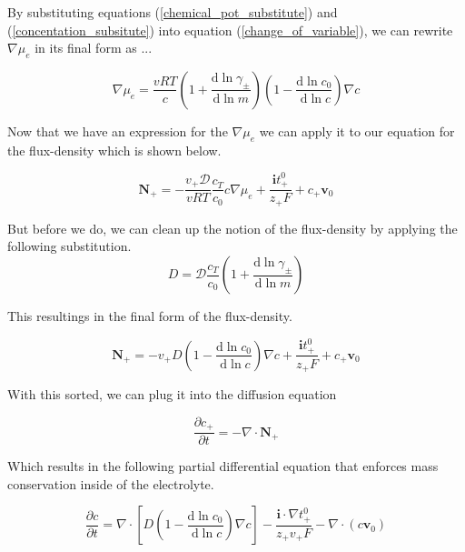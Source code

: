 \documentclass[lettersize,journal]{IEEEtran}
\begin{document}
By substituting equations (\ref{chemical_pot_substitute}) and (\ref{concentation_subsitute}) into equation (\ref{change_of_variable}), we can rewrite $\nabla \mu_e$ in its final form as ...

\begin{equation}
\nabla \mu_{e}=\frac{v R T}{c}\left(1+\frac{\mathrm{d} \ln \gamma_{\pm}}{\mathrm{d} \ln m}\right)\left(1-\frac{\mathrm{d} \ln c_{0}}{\mathrm{~d} \ln c}\right) \nabla c
\end{equation}


Now that we have an expression for the $\nabla \mu_e$ we can apply it to our equation for the flux-density which is shown below.

\begin{equation}
\mathbf{N}_{+}=-\frac{v_{+} \mathscr{D}}{v R T} \frac{c_{T}}{c_{0}} c \nabla \mu_{e}+\frac{\mathbf{i} t_{+}^{0}}{z_{+} F}+c_{+} \mathbf{v}_{0}
\end{equation}

But before we do, we can clean up the notion of the flux-density by applying the following substitution.
\begin{equation}
D=\mathscr{D} \frac{c_{T}}{c_{0}}\left(1+\frac{\mathrm{d} \ln \gamma_{\pm}}{\mathrm{d} \ln m}\right)
\end{equation}

This resultings in the final form of the flux-density.

\begin{equation}
\mathbf{N}_{+}=-v_{+} D\left(1-\frac{\mathrm{d} \ln c_{0}}{\mathrm{~d} \ln c}\right) \nabla c+\frac{\mathbf{i} t_{+}^{0}}{z_{+} F}+c_{+} \mathbf{v}_{0}
\end{equation}

With this sorted, we can plug it into the diffusion equation

\begin{equation}
\frac{\partial c_{+}}{\partial t}=-\nabla \cdot \mathbf{N}_{+}
\end{equation}



Which results in the following partial differential equation that enforces mass conservation inside of the electrolyte.



\begin{equation}
  \frac{\partial c}{\partial t}=\nabla \cdot\left[D\left(1-\frac{\mathrm{d} \ln c_{0}}{\mathrm{~d} \ln c}\right) \nabla c\right]-\frac{\mathbf{i} \cdot \nabla t_{+}^{0}}{z_{+} v_{+} F}-\nabla \cdot\left(c \mathbf{v}_{0}\right)
\end{equation}
\end{document}
